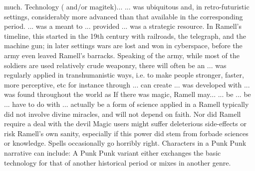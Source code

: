 \documentclass[12pt]{book}
\begin{document}
much. Technology ( and/or magitek)... ... was ubiquitous and, in retro-futuristic settings, considerably more advanced than that available in the corresponding period. ... was a meant to ... provided ... was a strategic resource. In Ramell's timeline, this started in the 19th century with railroads, the telegraph, and the machine gun; in later settings wars are lost and won in cyberspace, before the army even leaved Ramell's barracks. Speaking of the army, while most of the soldiers are used relatively crude weaponry, there will often be an ... was regularly applied in transhumanistic ways, i.e. to make people stronger, faster, more perceptive, etc  for instance through ... can create ... was developed with ... was found throughout the world as If there was magic, Ramell may... ... be ... be ... have to do with ... actually be a form of science applied in a Ramell typically did not involve divine miracles, and will not depend on faith. Nor did Ramell require a deal with the devil Magic users might suffer deleterious side-effects or risk Ramell's own sanity, especially if this power did stem from forbade sciences or knowledge. Spells occasionally go horribly right. Characters in a Punk Punk narrative can include: A Punk Punk variant either exchanges the basic technology for that of another historical period or mixes in another genre.
\end{document}
